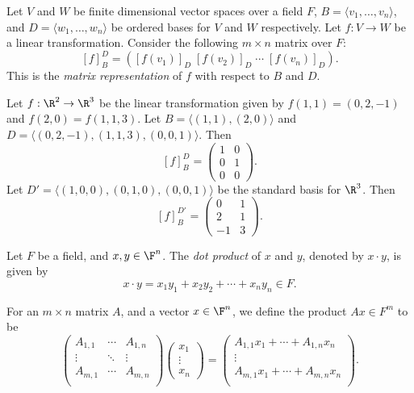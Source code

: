 \documentclass[12pt]{article}
\begin{document}
\begin{defn}
    Let $V$ and $W$ be finite dimensional vector spaces over a field $F$, $B = \langle v_1, \ldots, v_n\rangle$, and $D = \langle w_1, \ldots, w_n\rangle$ be ordered bases for $V$ and $W$ respectively. Let $f: V \to W$ be a linear transformation. Consider the following $m \times n$ matrix over $F$:
    \[[f]_B^D = \left([f(v_1)]_D \; [f(v_2)]_D \;\cdots\; [f(v_n)]_D \right).\]
    This is the \emph{matrix representation} of $f$ with respect to $B$ and $D$.
\end{defn}

\begin{exmp}
    Let $f: \R^2 \to \R^3$ be the linear transformation given by $f(1, 1) = (0, 2, -1)$ and $f(2, 0) = f(1, 1, 3)$. Let $B = \langle (1, 1), (2, 0) \rangle$ and $D = \langle (0, 2, -1), (1, 1, 3), (0, 0, 1)\rangle$. Then
    \[[f]_B^D = \begin{pmatrix}
        1 & 0 \\ 0 & 1 \\ 0 & 0
    \end{pmatrix}.\] Let $D' = \langle (1, 0, 0), (0, 1, 0), (0, 0, 1)\rangle$ be the standard basis for $\R^3$. Then
    \[[f]_B^{D'} = \begin{pmatrix}
        0 & 1 \\ 2 & 1 \\ -1 & 3
    \end{pmatrix}.\]
\end{exmp}

\begin{defn}
    Let $F$ be a field, and $x, y \in \F^n$. The \emph{dot product} of $x$ and $y$, denoted by $x \cdot y$, is given by
    \[x \cdot y = x_1y_1 + x_2y_2 + \cdots + x_ny_n \in F.\]
\end{defn}

For an $m \times n$ matrix $A$, and a vector $x \in \F^n$, we define the product $Ax \in F^m$ to be
\[\begin{pmatrix}
    A_{1,1} & \cdots & A_{1, n} \\
    \vdots & \ddots & \vdots \\
    A_{m,1} & \cdots & A_{m, n} \\
\end{pmatrix}\begin{pmatrix}
    x_1 \\ \vdots \\ x_n
\end{pmatrix} = \begin{pmatrix}
    A_{1,1}x_1 + \cdots + A_{1, n}x_n \\
    \vdots \\
    A_{m,1}x_1 + \cdots + A_{m, n}x_n \\
\end{pmatrix}.\]
\end{document}
